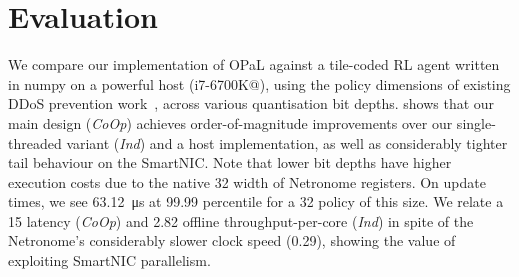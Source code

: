 \documentclass[
sigconf,natbib=false
,anonymous=true
]{acmart}
\newcommand{\approachshort}{OPaL}
\newcommand{\Coopfw}{\emph{CoOp}}
\newcommand{\coopfw}{\Coopfw}
\newcommand{\Indfw}{\emph{Ind}}
\newcommand{\indfw}{\Indfw}
\begin{document}
\section{Evaluation}
We compare our implementation of \approachshort{} against a tile-coded RL agent written in numpy on a powerful host (i7-6700K@), using the policy dimensions of existing DDoS prevention work~\parencite{DBLP:journals/tnsm/SimpsonRP20}, across various quantisation bit depths.
 shows that our main design (\coopfw) achieves order-of-magnitude improvements over our single-threaded variant (\indfw) and a host implementation, as well as considerably tighter tail behaviour on the SmartNIC.
Note that lower bit depths have higher execution costs due to the native \qty{32}{\bit} width of Netronome registers.
On update times, we see \qty{63.12}{\micro\second} at 99.99 percentile for a \qty{32}{\bit} policy of this size.
We relate a \qty{15}{\texttimes} latency (\coopfw) and \qty{2.82}{\texttimes} offline throughput-per-core (\indfw) in spite of the Netronome's considerably slower clock speed (\qty{0.29}{\texttimes}), showing the value of exploiting SmartNIC parallelism.
\end{document}

